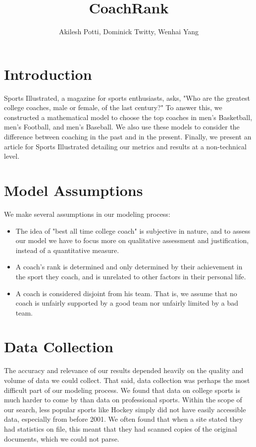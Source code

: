 \documentclass[titlepage]{article}
\begin{document}
\title{CoachRank}
\author{Akilesh Potti, Dominick Twitty, Wenhai Yang}
\maketitle


\tableofcontents

\section{Introduction}
Sports Illustrated, a magazine for sports enthusiasts, asks, "Who are the greatest college coaches, male or female, of the last century?" To answer this, we constructed a mathematical model to choose the top coaches in men's Basketball, men's Football, and men's Baseball. We also use these models to consider the difference between coaching in the past and in the present. Finally, we present an article for Sports Illustrated detailing our metrics and results at a non-technical level.

\section{Model Assumptions}
We make several assumptions in our modeling process:
\begin{itemize}
\item The idea of "best all time college coach" is subjective in nature, and to assess our model we have to focus more on qualitative assessment and justification, instead of a quantitative measure.

\item A coach's rank is determined and only determined by their achievement in the sport they coach, and is unrelated to other factors in their personal life.

\item A coach is considered disjoint from his team. That is, we assume that no coach is unfairly supported by a good team nor unfairly limited by a bad team.
\end{itemize}

\section{Data Collection}
The accuracy and relevance of our results depended heavily on the quality and volume of data we could collect. That said, data collection was perhaps the most difficult part of our modeling process. We found that data on college sports is much harder to come by than data on professional sports. Within the scope of our search, less popular sports like Hockey simply did not have easily accessible data, especially from before 2001. We often found that when a site stated they had statistics on file, this meant that they had scanned copies of the original documents, which we could not parse.
\end{document}
